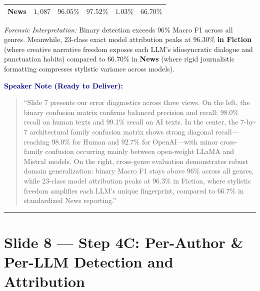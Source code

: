 \documentclass[11pt, a4paper]{article}
\newenvironment{speakernote}{%
    \par\vspace{0.2cm}%
    \noindent\textbf{\textcolor{navy}{Speaker Note (Ready to Deliver):}}\par\vspace{0.1cm}%
    \begin{quote}\itshape\color{slate}%
}{%
    \end{quote}\vspace{0.2cm}%
}
\begin{document}
\begin{enumerate}[itemsep=3pt]
\begin{center}
\begin{tabular}{lccccc}
    \textbf{News}    & $1,087$ & $\mathbf{96.05\%}$ & $97.52\%$ & $1.03\%$ & $66.70\%$ \\
    \bottomrule
    \end{tabular}
    \end{center}
    \textit{Forensic Interpretation:} Binary detection exceeds $96\%$ Macro F1 across all genres. Meanwhile, $23$-class exact model attribution peaks at $\mathbf{96.30\%}$ \textbf{in Fiction} (where creative narrative freedom exposes each LLM's idiosyncratic dialogue and punctuation habits) compared to $66.70\%$ in \textbf{News} (where rigid journalistic formatting compresses stylistic variance across models).
\end{enumerate}

\begin{speakernote}
``Slide 7 presents our error diagnostics across three views. On the left, the binary confusion matrix confirms balanced precision and recall: 98.0\% recall on human texts and 99.1\% recall on AI texts. In the center, the 7-by-7 architectural family confusion matrix shows strong diagonal recall---reaching 98.0\% for Human and 92.7\% for OpenAI---with minor cross-family confusion occurring mainly between open-weight LLaMA and Mistral models. On the right, cross-genre evaluation demonstrates robust domain generalization: binary Macro F1 stays above 96\% across all genres, while 23-class model attribution peaks at 96.3\% in Fiction, where stylistic freedom amplifies each LLM's unique fingerprint, compared to 66.7\% in standardized News reporting.''
\end{speakernote}

\vspace{0.3cm}\hrule\vspace{0.3cm}

\section{Slide 8 --- Step 4C: Per-Author \& Per-LLM Detection and Attribution}
\end{document}
